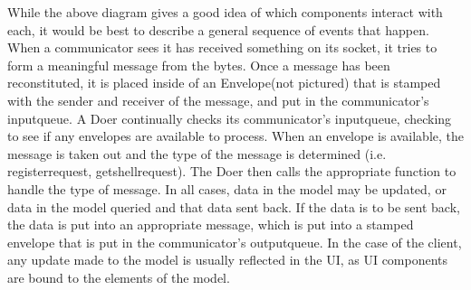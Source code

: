 \documentclass[12pt]{article}
\begin{document}
			While the above diagram gives a good idea of which components interact with each, it would be best to describe a general sequence of events that happen. When a communicator sees it has received something on its socket, it tries to form a meaningful message from the bytes. Once a message has been reconstituted, it is placed inside of an Envelope(not pictured) that is stamped with the sender and receiver of the message, and put in the communicator's inputqueue. A Doer continually checks its communicator's inputqueue, checking to see if any envelopes are available to process. When an envelope is available, the message is taken out and the type of the message is determined (i.e. registerrequest, getshellrequest). The Doer then calls the appropriate function to handle the type of message. In all cases, data in the model may be updated, or data in the model queried and that data sent back. If the data is to be sent back, the data is put into an appropriate message, which is put into a stamped envelope that is put in the communicator's outputqueue. In the case of the client, any update made to the model is usually reflected in the UI, as UI components are bound to the elements of the model.
\end{document}
